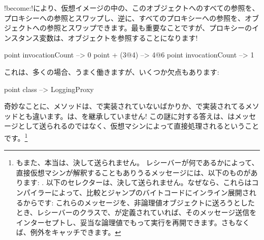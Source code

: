 \documentclass[a4paper,10pt,twoside]{book}
\begin{document}
\ct!become:!により、仮想イメージの中の、このオブジェクトへのすべての参照を、プロキシーへの参照とスワップし、逆に、すべてのプロキシーへの参照を、オブジェクトへの参照とスワップできます。最も重要なことですが、プロキシーのインスタンス変数は、オブジェクトを参照することになります!

\begin{code}{}
point invocationCount --> 0
point + (3@4)             --> 4@6
point invocationCount --> 1
\end{code}

これは、多くの場合、うまく働きますが、いくつか欠点もあります:
\begin{code}{}
point class --> LoggingProxy
\end{code}
奇妙なことに、メソッドは、で実装されていないばかりか、で実装されてるメソッドとも違います。は、を継承していません!
この謎に対する答えは、はメッセージとして送られるのではなく、仮想マシンによって直接処理されるということです。\footnote{もまた、本当は、決して送られません。
レシーバーが何であるかによって、直接仮想マシンが解釈することもありうるメッセージには、以下のものがあります:
\ct{+- < > <= >= = ~= * / \ ==}
.
以下のセレクターは、決して送られません。なぜなら、これらはコンパイラーによって、比較とジャンプのバイトコードにインライン展開されるからです:
これらのメッセージを、非論理値オブジェクトに送ろうとしたとき、レシーバーのクラスで、が定義されていれば、そのメッセージ送信をインターセプトし、妥当な論理値でもって実行を再開できます。さもなくば、例外をキャッチできます。
}%
\end{document}
